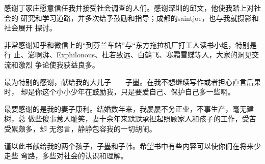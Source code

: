 感谢丁家庄愿意信任我并接受社会调查的人们。感谢深圳的邱文，他使我踏上对社会的
研究和学习道路，并多次给予鼓励和指导；成都的saintjoe，也与我就摄影和社会展开
探讨。

非常感谢知乎和微信上的“到芬兰车站”与“东方拖拉机厂打工人读书小组，特别是行
止、澎啊湃、Exphilonous、杜若致远、白鹤飞、寒霜雪蝶等人，大家的洞见交流和激烈
争论使我获益良多。


最为特别的感谢，献给我的大儿子——子墨。在我不想继续写作或者担心直言后果时，
却是你这个小小少年在鼓励我，只是要爱自己、保护自己多一些啊。

最要感谢的是我的妻子康利。结婚数年来，我屡屡不务正业，不事生产，毫无建树，总
做些傻事惹人耻笑，妻十余年来默默承担起照顾家人和孩子的工作，受苦受累颇多，却
无怨言，静静包容我的一切胡闹。

谨以此书献给我的两个孩子，子墨和子韩。希望书中有些内容可以使你们在将来少走些
弯路，多些对社会的认识和理解。







